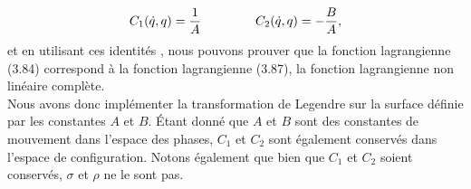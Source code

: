 \documentclass[12pt,a4paper, openany]{report}
\begin{document}
	\begin{equation}
		C_1(\dot{q}, q )=\frac{1}{A} \hspace{1.5cm} 	C_2(\dot{q}, q )=-\frac{B}{A},
	\end{equation} et en utilisant ces identités , nous pouvons prouver que la fonction lagrangienne (3.84) correspond à la fonction lagrangienne (3.87), la fonction lagrangienne non linéaire complète.\\
	Nous avons donc implémenter la transformation de Legendre sur la surface définie par les constantes $A$ et $B$. Étant donné que $A$ et $B$ sont des constantes de mouvement dans l'espace des phases, $C_1$ et $C_2$ sont également conservés dans l'espace de configuration. Notons également que bien que  $C_1$ et $C_2$ soient conservés, $\sigma$ et $\rho$ ne le sont pas.
	
\end{document}
